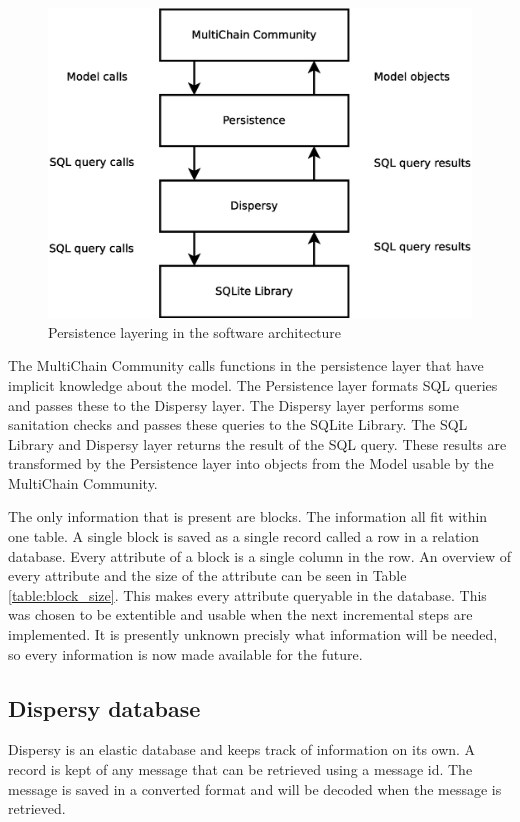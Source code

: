\begin{figure}
	\centerline{\includegraphics[scale=0.3]{design/figs/persistence-layer.eps}}
	\caption{Persistence layering in the software architecture}
	\label{fig:persistence-layer}
\end{figure}

The MultiChain Community calls functions in the persistence layer that have implicit knowledge about the model.
The Persistence layer formats SQL queries and passes these to the Dispersy layer.
The Dispersy layer performs some sanitation checks and passes these queries to the SQLite Library.
The SQL Library and Dispersy layer returns the result of the SQL query.
These results are transformed by the Persistence layer into objects from the Model usable by the MultiChain Community.

The only information that is present are blocks.
The information all fit within one table.
A single block is saved as a single record called a row in a relation database.
Every attribute of a block is a single column in the row.
An overview of every attribute and the size of the attribute can be seen in Table \ref{table:block_size}.
This makes every attribute queryable in the database.
This was chosen to be extentible and usable when the next incremental steps are implemented.
It is presently unknown precisly what information will be needed,
so every information is now made available for the future.

\subsection{Dispersy database}
Dispersy is an elastic database and keeps track of information on its own.
A record is kept of any message that can be retrieved using a message id.
The message is saved in a converted format and will be decoded when the message is retrieved.


